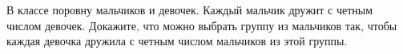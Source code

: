 В классе поровну мальчиков и девочек. Каждый мальчик дружит с четным числом девочек. Докажите, что можно
выбрать группу из мальчиков так, чтобы каждая девочка дружила с четным числом мальчиков из этой группы.